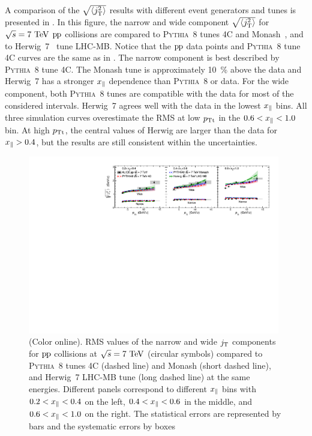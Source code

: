 A comparison of the $\sqrt{\left<j_{\rm T}^2\right>}$ results with different event generators and tunes is presented in . In this figure, the narrow and wide component $\sqrt{\left<j_{\rm T}^2\right>}$ for $\sqrt{s} = 7~\mathrm{TeV}$ $\mbox{p\kern-0.05em p}$ collisions are compared to \textsc{Pythia}~8 tunes 4C and Monash~\cite{pythiaMonashTune}, and to Herwig~7~\cite{herwigManual,herwig7releaseNote} tune LHC-MB. Notice that the $\mbox{p\kern-0.05em p}$ data points and \textsc{Pythia}~8 tune 4C curves are the same as in . The narrow component is best described by \textsc{Pythia}~8 tune 4C. The Monash tune is approximately 10~\% above the data and Herwig~7 has a stronger $x_{\parallel}$ dependence than \textsc{Pythia}~8 or data. For the wide component, both \textsc{Pythia}~8 tunes are compatible with the data for most of the considered intervals. Herwig~7 agrees well with the data in the lowest $x_{\parallel}$ bins. All three simulation curves overestimate the RMS at low $p_{\rm Tt}$ in the $0.6 < x_{\parallel} < 1.0$ bin. At high $p_{\rm Tt}$, the central values of Herwig are larger than the data for $ x_{\parallel} > 0.4$, but the results are still consistent within the uncertainties.
  
  \begin{figure}[t]
    \begin{center}
      \includegraphics[width = 0.98\textwidth]{figures/results/jt_RMS_finalFormComparisonUniformTextSize}
    \end{center}
    \caption{(Color online). RMS values of the narrow and wide $j_{\rm T}$ components for $\mbox{p\kern-0.05em p}$ collisions at $\sqrt{s} = 7~\mathrm{TeV}$ (circular symbols) compared to \textsc{Pythia}~8 tunes 4C (dashed line) and Monash (short dashed line), and Herwig~7 LHC-MB tune (long dashed line) at the same energies. Different panels correspond to different $x_{\parallel}$ bins with $0.2 < x_{\parallel} < 0.4$ on the left, $0.4 < x_{\parallel} < 0.6$ in the middle, and $0.6 < x_{\parallel} < 1.0$ on the right. The statistical errors are represented by bars and the systematic errors by boxes}
    \label{fig:jtRMSmcComparison}
  \end{figure}
 
